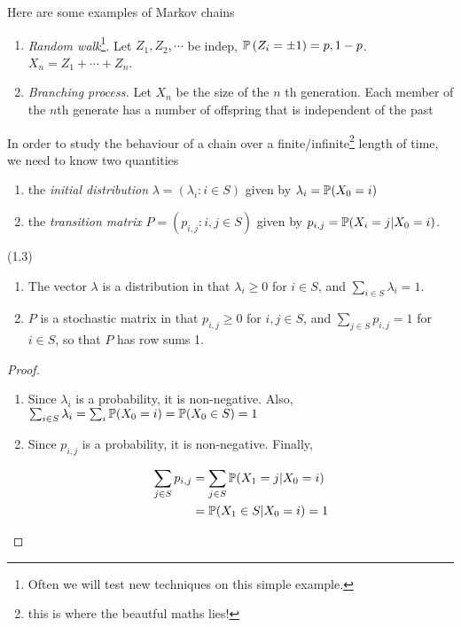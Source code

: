\documentclass[a4paper]{article}
\begin{document}
\begin{eg} Here are some examples of Markov chains
	\begin{enumerate}
		
		
		\item \emph{Random walk}\footnote{Often we will test new techniques on this simple example.}. Let $ Z_{1},Z_{2}, \cdots  $ be indep, $ \P\left( Z_{i} = \pm 1 \right) = p, 1-p $.
		$ X_{n} = Z_{1} + \cdots + Z_{n} $. 
		
		\item \emph{Branching process.} Let $ X_{n} $ be the size of the $n$ th generation. Each member of the $ n $th generate has a number of offspring that is independent of the past
	\end{enumerate}
	
\end{eg}



In order to study the behaviour of a chain over a finite/infinite\footnote{this is where the beautful maths lies!} length of time, we need to know two quantities

\begin{enumerate}
	\item the \emph{initial distribution} $ \lambda = (\lambda_{i} : i \in S) $ given by $ \lambda_{i} = \P(X_{0} = i) $
	
	\item the \emph{transition matrix} $ P = (p_{i,j}  : i,j \in S ) $ given by $ p_{i,j} = \P(X_{i} = j | X_{0} = i) $.
	
\end{enumerate}



\begin{prop} (1.3)
\begin{enumerate}
	\item The vector $ \lambda $ is a distribution in that $ \lambda_{i} \geq 0 $ for $ i \in S $, and $ \sum_{i\in S} \lambda_{i} = 1 $.
	\item $ P $ is a stochastic matrix in that $ p_{i,j} \geq 0 $ for $ i,j \in S $, and $ \sum_{j \in S} p_{i,j} = 1  $ for $ i \in S $, so that $ P $ has row sums 1.
\end{enumerate}
	
\end{prop}

\begin{proof}
	\begin{enumerate}
	\item Since $ \lambda_{i} $ is a probability, it is non-negative. Also, $ \sum_{i \in S} \lambda_{i} = \sum_{i} \P(X_{0} = i) = \P(X_{0} \in S) = 1 $
	\item Since $ p_{i,j} $ is a probability, it is non-negative. Finally, 
	
	\begin{align*}
	\sum_{j\in S} p_{i,j} & = \sum_{j \in S} \P( X_{1} = j| X_{0} = i ) \\
	& = \P(X_{1} \in S | X_{0} = i)  = 1
	\end{align*}
	\end{enumerate}
\end{proof}
\end{document}
